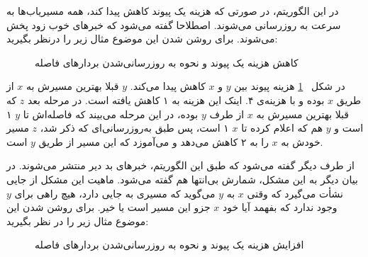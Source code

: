   در این الگوریتم، در صورتی که هزینه یک پیوند کاهش پیدا کند، همه مسیریاب‌ها به سرعت به روزرسانی می‌شوند. اصطلاحا گفته می‌شود که خبرهای خوب زود پخش می‌شوند. برای روشن شدن این موضوع مثال زیر را درنظر بگیرید:
  

 \begin{figure}[H]
\centering
{}
\caption{کاهش هزینه یک پیوند و نحوه به روزرسانی‌شدن بردار‌های فاصله}
\label{fig:goodnews}
\end{figure}
 

 در شکل 
 ~\ref{fig:goodnews}
 هزینه پیوند بین $y$ و $x$ کاهش پیدا می‌کند. $y$ قبلا بهترین مسیرش به $x$ از طریق $x$ بوده و با هزینه‌ی ۴. اینک این هزینه به ۱ کاهش یافته است. در مرحله بعد $z$ که قبلا بهترین مسیرش به $x$ از طرف $y$ بوده، در این مرحله می‌بیند که فاصله‌اش تا $y$ ۱ است و $y$ هم که اعلام کرده تا $x$ ۱ است، پس طبق به‌روزرسانی‌ای که ذکر شد، $z$  مسیر خودش به $x$ را به ۲ کاهش می‌دهد و می‌آموزد که این مسیر از طریق $y$ است. 
 
 از طرف دیگر گفته می‌شود که طبق این الگوریتم، خبرهای بد دیر منتشر می‌شوند. در بیان دیگر به این مشکل، شمارش بی‌انتها هم گفته می‌شود. ماهیت این مشکل از جایی نشأت می‌گیرد که وقتی $x$ به $y$ می‌گوید که مسیری به جایی دارد، هیچ راهی برای $y$ وجود ندارد که بفهمد آیا خود $x$ جزو این مسیر است یا خیر. برای روشن شدن این موضوع مثال زیر را در نظر بگیرید: 
 
 \begin{figure}[H]
\centering
{}
\caption{افزایش هزینه یک پیوند و نحوه به روزرسانی‌شدن بردار‌های فاصله}
\label{fig:badnews}
\end{figure}
 
